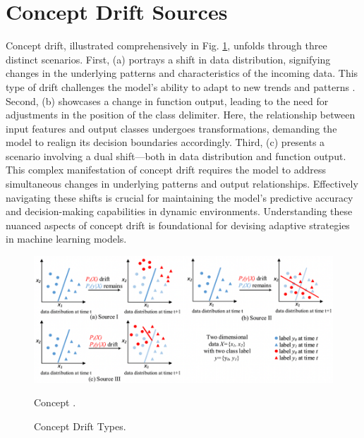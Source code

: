 \section{Concept Drift Sources}
\label{sec:background_concept_drift_sources}
Concept drift, illustrated comprehensively in Fig. \ref{fig:concept-drift-sources}, unfolds through three distinct scenarios. First, (a) portrays a shift in data distribution, signifying changes in the underlying patterns and characteristics of the incoming data. This type of drift challenges the model's ability to adapt to new trends and patterns \cite{lu2016concept} \cite{gama2014survey} \cite{losing2016knn} \cite{storkey2008training}.
Second, (b) showcases a change in function output, leading to the need for adjustments in the position of the class delimiter. Here, the relationship between input features and output classes undergoes transformations, demanding the model to realign its decision boundaries accordingly.
 Third, (c) presents a scenario involving a dual shift—both in data distribution and function output. This complex manifestation of concept drift requires the model to address simultaneous changes in underlying patterns and output relationships. Effectively navigating these shifts is crucial for maintaining the model's predictive accuracy and decision-making capabilities in dynamic environments. Understanding these nuanced aspects of concept drift is foundational for devising adaptive strategies in machine learning models.
 
\begin{figure}[!ht]
    \centering
    \includegraphics[width=.9\textwidth]{2_Background/figures/concept_drift_sources.png}
    \caption{Concept .}
    \caption{Concept Drift Types.}
    \label{fig:concept-drift-sources}
\end{figure}

